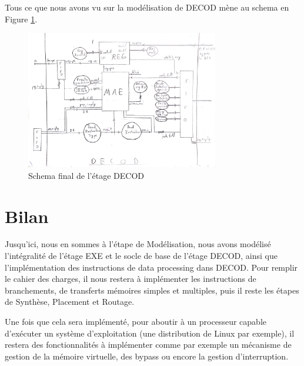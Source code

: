 \documentclass{article}
\begin{document}
Tous ce que nous avons vu sur la modélisation de DECOD mène au schema en Figure \ref{dec}.

\begin{figure}[H]
\includegraphics[width=0.75\textwidth]{pics/dec.png}
\centering
\caption{Schema final de l'étage DECOD} 
\label{dec}
\end{figure}

\section{Bilan}

Jusqu'ici, nous en sommes à l'étape de Modélisation, nous avons modélisé l'intégralité de l'étage EXE
et le socle de base de l'étage DECOD, ainsi que l'implémentation des instructions de data processing dans DECOD.
Pour remplir le cahier des charges, il nous restera à implémenter les instructions de branchements, de
transferts mémoires simples et multiples, puis il reste les étapes de Synthèse, Placement et Routage.

Une fois que cela sera implémenté, pour aboutir à un processeur capable d'exécuter un système d'exploitation
(une distribution de Linux par exemple), il restera des fonctionnalités à implémenter comme par exemple
un mécanisme de gestion de la mémoire virtuelle, des bypass ou encore la gestion d'interruption.

\end{document}
